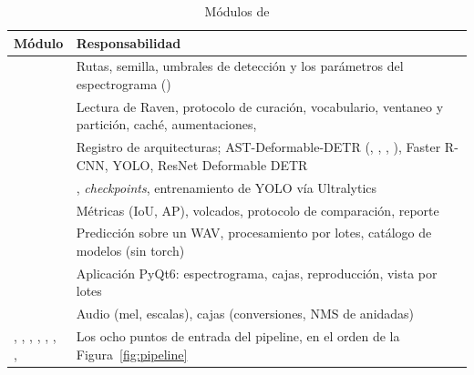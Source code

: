 \documentclass[12pt,a4paper]{article}
\begin{document}
\begin{table}[htbp]
    \centering
    \caption{Módulos de }
    \label{tab:modulos}
    \small
    \begin{tabular}{@{}L{4.0cm}L{10.2cm}@{}}
        \toprule
        \textbf{Módulo} & \textbf{Responsabilidad} \\
        \midrule
         & Rutas, semilla, umbrales de detección y los parámetros del espectrograma () \\
         & Lectura de Raven, protocolo de curación, vocabulario, ventaneo y partición, caché, aumentaciones,  \\
         & Registro de arquitecturas; AST-Deformable-DETR (, , , ), Faster R-CNN, YOLO, ResNet Deformable DETR \\
         & , \emph{checkpoints}, entrenamiento de YOLO vía Ultralytics \\
         & Métricas (IoU, AP), volcados, protocolo de comparación, reporte \\
         & Predicción sobre un WAV, procesamiento por lotes, catálogo de modelos (sin torch) \\
         & Aplicación PyQt6: espectrograma, cajas, reproducción, vista por lotes \\
         & Audio (mel, escalas), cajas (conversiones, NMS de anidadas) \\
        , , , , , , ,  & Los ocho puntos de entrada del pipeline, en el orden de la Figura~\ref{fig:pipeline} \\
        \bottomrule
    \end{tabular}
\end{table}


\clearpage


\end{document}
